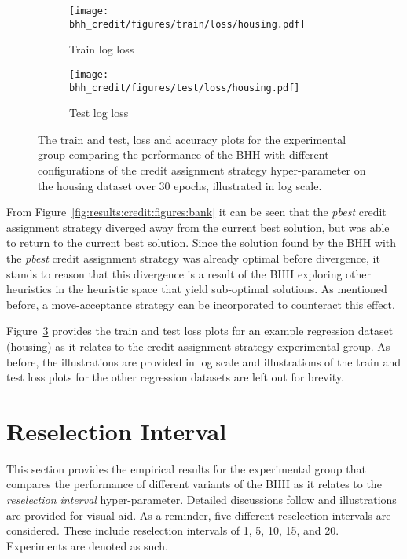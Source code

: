 \begin{figure}[htbp]
      \begin{subfigure}{0.5\textwidth}
            \centering
            \texttt{[image: bhh\_credit/figures/train/loss/housing.pdf]}
            \caption{Train log loss}
            \label{fig:results:credit:figures:loss:train:housing}
      \end{subfigure}
      \begin{subfigure}{0.5\textwidth}
            \centering
            \texttt{[image: bhh\_credit/figures/test/loss/housing.pdf]}
            \caption{Test log loss}
            \label{fig:results:credit:figures:loss:test:housing}
      \end{subfigure}
      \par\bigskip
      \caption{The train and test, loss and accuracy plots for the experimental group comparing the performance of the \acs{BHH} with different configurations of the credit assignment strategy hyper-parameter on the housing dataset over 30 epochs, illustrated in log scale.}
      \label{fig:results:credit:figures:housing}
\end{figure}

From Figure~\ref{fig:results:credit:figures:bank} it can be seen that the \textit{pbest} credit assignment strategy diverged away from the current best solution, but was able to return to the current best solution. Since the solution found by the \acs{BHH} with the \textit{pbest} credit assignment strategy was already optimal before divergence, it stands to reason that this divergence is a result of the \acs{BHH} exploring other heuristics in the heuristic space that yield sub-optimal solutions. As mentioned before, a move-acceptance strategy can be incorporated to counteract this effect.

Figure~\ref{fig:results:credit:figures:housing} provides the train and test loss plots for an example regression dataset (housing) as it relates to the credit assignment strategy experimental group. As before, the illustrations are provided in log scale and illustrations of the train and test loss plots for the other regression datasets are left out for brevity.


\section{Reselection Interval}\label{sec:results:reselection}

This section provides the empirical results for the experimental group that compares the performance of different variants of the \acs{BHH} as it relates to the \textit{reselection interval} hyper-parameter. Detailed discussions follow and illustrations are provided for visual aid. As a reminder, five different reselection intervals are considered. These include reselection intervals of 1, 5, 10, 15, and 20. Experiments are denoted as such.

